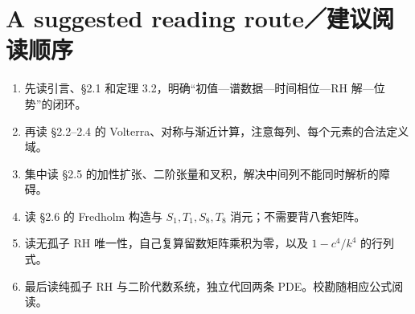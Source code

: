 \section{A suggested reading route／建议阅读顺序}
\begin{enumerate}
\item 先读引言、§2.1 和定理 3.2，明确“初值—谱数据—时间相位—RH 解—位势”的闭环。
\item 再读 §2.2--2.4 的 Volterra、对称与渐近计算，注意每列、每个元素的合法定义域。
\item 集中读 §2.5 的加性扩张、二阶张量和叉积，解决中间列不能同时解析的障碍。
\item 读 §2.6 的 Fredholm 构造与 $S_1,T_1,S_8,T_8$ 消元；不需要背八套矩阵。
\item 读无孤子 RH 唯一性，自己复算留数矩阵乘积为零，以及 $1-c^4/k^4$ 的行列式。
\item 最后读纯孤子 RH 与二阶代数系统，独立代回两条 PDE。校勘随相应公式阅读。
\end{enumerate}
